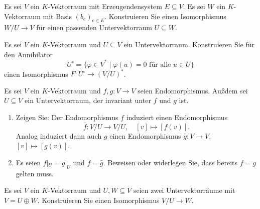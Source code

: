

\begin{question}[subtitle = Vektorräume als Quotienten freier Vektorräume]{2}
  Es sei $V$ ein $K$-Vektorraum mit Erzeugendensystem $E \subseteq V$.
  Es sei $W$ ein $K$-Vektorraum mit Basis $(b_e)_{e \in E}$.
  Konstruieren Sie einen Isomorphismus $W\!/U \to V$ für einen passenden Untervektorraum $U \subseteq W$.
\end{question}


\begin{question}[subtitle = Annihilatoren als Dualräume von Quotienten]{2}
  Es sei $V$ ein $K$-Vektorraum und $U \subseteq V$ ein Untervektorraum.
  Konstruieren Sie für den Annihilator
  \[
      U^\circ
    = \{ \varphi \in V^* \mid \text{$\varphi(u) = 0$ für alle $u \in U$} \}
  \]
  einen Isomorphismus $F \colon U^\circ \to (V\!/U)^*$.
\end{question}


\begin{question}[subtitle = Induzierte Endomorphismen auf Quotienten]{2}
  Es sei $V$ ein $K$-Vektorraum und $f, g \colon V \to V$ seien Endomorphismus.
  Außdem sei $U \subseteq V$ ein Untervektorraum, der invariant unter $f$ und $g$ ist.
  \begin{enumerate}[leftmargin=*]
    \item
      Zeigen Sie: Der Endomorphismus $f$ induziert einen Endomorphismus
      \[
        \bar{f} \colon V\!/U \to V\!/U,
        \quad
        [v] \mapsto [f(v)].
      \]
      Analog induziert dann auch $g$ einen Endomorphismus $\bar{g} \colon V \to V$, $[v] \mapsto [g(v)]$.
    \item
      Es seien $f|_U = g|_U$ und $\bar{f} = \bar{g}$.
      Beweisen oder widerlegen Sie, dass bereits $f = g$ gelten muss.
  \end{enumerate}
\end{question}







\begin{question}[subtitle = Herausteilen von direkten Summanden]{3}
  Es sei $V$ ein $K$-Vektorraum und $U, W \subseteq V$ seien zwei Untervektorräume mit $V = U \oplus W$.
  Konstruieren Sie einen Isomorphismus $V\!/U \to W$.
\end{question}



